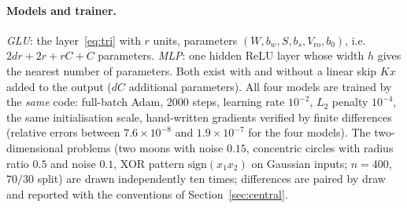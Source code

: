 \documentclass[11pt,a4paper]{article}
\theoremstyle{plain}
\theoremstyle{definition}
\theoremstyle{remark}
\begin{document}
\paragraph{Models and trainer.} \emph{GLU}: the layer~\eqref{eq:tri} with
$r$ units, parameters $(W,b_w,S,b_s,V_{\mathrm{ro}},b_0)$, i.e.\
$2dr+2r+rC+C$ parameters. \emph{MLP}: one hidden ReLU layer whose width $h$
gives the nearest number of parameters. Both exist with and without a
linear skip $Kx$ added to the output ($dC$ additional parameters). All four
models are trained by the \emph{same} code: full-batch Adam, $2000$ steps,
learning rate $10^{-2}$, $L_2$ penalty $10^{-4}$, the same initialisation
scale, hand-written gradients verified by finite differences (relative
errors between $7.6\times10^{-8}$ and $1.9\times10^{-7}$ for the four
models). The two-dimensional problems (two moons with noise $0.15$,
concentric circles with radius ratio $0.5$ and noise $0.1$, XOR pattern
$\mathrm{sign}(x_1x_2)$ on Gaussian inputs; $n=400$, $70/30$ split) are
drawn independently ten times; differences are paired by draw and reported
with the conventions of Section~\ref{sec:central}.
\end{document}
